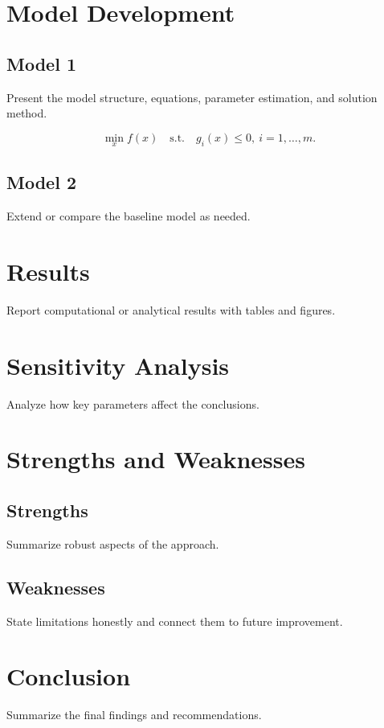 \documentclass{mcmthesis}
\begin{document}
\section{Model Development}
\subsection{Model 1}
Present the model structure, equations, parameter estimation, and solution method.

\begin{equation}
  \min_x f(x) \quad \text{s.t.} \quad g_i(x) \le 0,\ i=1,\dots,m.
\end{equation}

\subsection{Model 2}
Extend or compare the baseline model as needed.

\section{Results}
Report computational or analytical results with tables and figures.

\section{Sensitivity Analysis}
Analyze how key parameters affect the conclusions.

\section{Strengths and Weaknesses}
\subsection{Strengths}
Summarize robust aspects of the approach.

\subsection{Weaknesses}
State limitations honestly and connect them to future improvement.

\section{Conclusion}
Summarize the final findings and recommendations.



\end{document}
